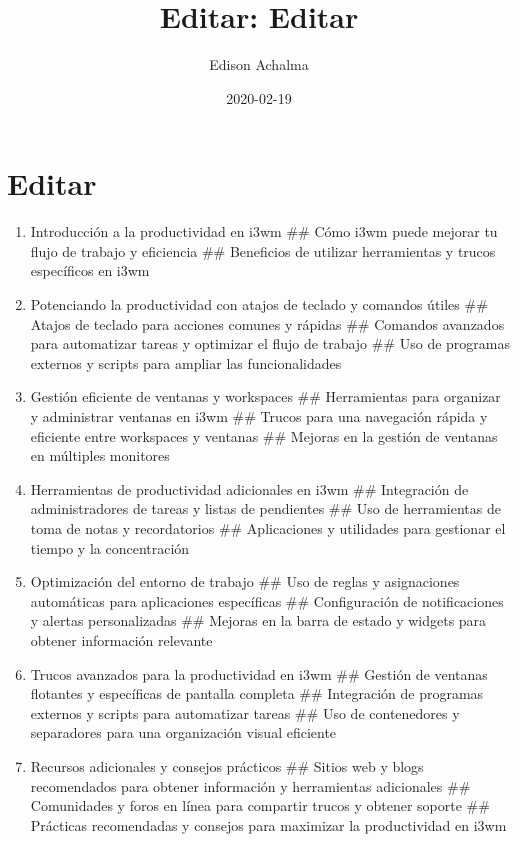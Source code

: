 \documentclass[
  jou,
  floatsintext,
  longtable,
  a4paper,
  nolmodern,
  notxfonts,
  notimes,
  colorlinks=true,linkcolor=blue,citecolor=blue,urlcolor=blue]{apa7}
\title{Editar: Editar}
\author{Edison Achalma}
\affiliation{
{Escuela Profesional de Economía, Universidad Nacional de San Cristóbal
de Huamanga}}
\date{2020-02-19}
\begin{document}
\maketitle

\hypertarget{toc}{}
\tableofcontents
\newpage
\section[Introduction]{Editar}

\setcounter{secnumdepth}{-\maxdimen} %

\setlength\LTleft{0pt}


\begin{enumerate}
\def\labelenumi{\arabic{enumi}.}
\item
  Introducción a la productividad en i3wm \#\# Cómo i3wm puede mejorar
  tu flujo de trabajo y eficiencia \#\# Beneficios de utilizar
  herramientas y trucos específicos en i3wm
\item
  Potenciando la productividad con atajos de teclado y comandos útiles
  \#\# Atajos de teclado para acciones comunes y rápidas \#\# Comandos
  avanzados para automatizar tareas y optimizar el flujo de trabajo \#\#
  Uso de programas externos y scripts para ampliar las funcionalidades
\item
  Gestión eficiente de ventanas y workspaces \#\# Herramientas para
  organizar y administrar ventanas en i3wm \#\# Trucos para una
  navegación rápida y eficiente entre workspaces y ventanas \#\# Mejoras
  en la gestión de ventanas en múltiples monitores
\item
  Herramientas de productividad adicionales en i3wm \#\# Integración de
  administradores de tareas y listas de pendientes \#\# Uso de
  herramientas de toma de notas y recordatorios \#\# Aplicaciones y
  utilidades para gestionar el tiempo y la concentración
\item
  Optimización del entorno de trabajo \#\# Uso de reglas y asignaciones
  automáticas para aplicaciones específicas \#\# Configuración de
  notificaciones y alertas personalizadas \#\# Mejoras en la barra de
  estado y widgets para obtener información relevante
\item
  Trucos avanzados para la productividad en i3wm \#\# Gestión de
  ventanas flotantes y específicas de pantalla completa \#\# Integración
  de programas externos y scripts para automatizar tareas \#\# Uso de
  contenedores y separadores para una organización visual eficiente
\item
  Recursos adicionales y consejos prácticos \#\# Sitios web y blogs
  recomendados para obtener información y herramientas adicionales \#\#
  Comunidades y foros en línea para compartir trucos y obtener soporte
  \#\# Prácticas recomendadas y consejos para maximizar la productividad
  en i3wm
\end{enumerate}
\end{document}
